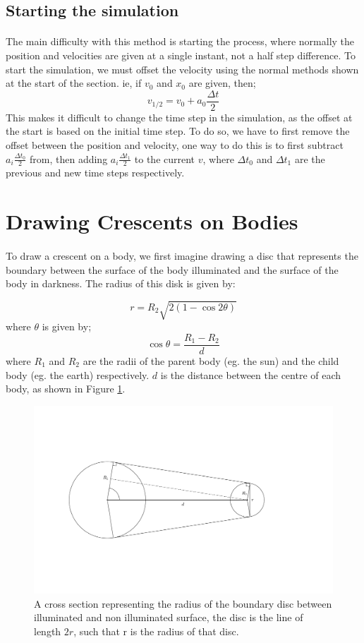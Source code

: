 \documentclass{article}
\begin{document}
\subsection{Starting the simulation}
\paragraph{}
The main difficulty with this method is starting the process, where normally the position and velocities are given at a single instant, not a half step difference.
To start the simulation, we must offset the velocity using the normal methods shown at the start of the section.
ie, if $v_0$ and $x_0$ are given, then;
$$v_{1/2} = v_0 + a_0 \frac{\Delta t}{2}$$
This makes it difficult to change the time step in the simulation, as the offset at the start is based on the initial time step.
To do so, we have to first remove the offset between the position and velocity, one way to do this is to first subtract $a_i \frac{\Delta t_0}{2}$ from, then adding $a_i \frac{\Delta t_1}{2}$ to the current $v$, where $\Delta t_0$ and $\Delta t_1$ are the previous and new time steps respectively. 

\section{Drawing Crescents on Bodies}
\paragraph{}To draw a crescent on a body, we first imagine drawing a disc that represents the boundary between the surface of the body illuminated and the surface of the body in darkness.
The radius of this disk is given by:

$$r = R_2\sqrt{2\left(1 - \cos{2\theta}\right)}$$
where $\theta$ is given by;
$$\cos{\theta} = \frac{R_1 - R_2}{d}$$
where $R_1$ and $R_2$ are the radii of the parent body (eg. the sun) and the child body (eg. the earth) respectively. $d$ is the distance between the centre of each body, as shown in Figure \ref{fig:crescentRadius}.
\begin{figure}
	\includegraphics[width = 14cm]{CrescentRadius.pdf}
	\caption{A cross section representing the radius of the boundary disc between illuminated and non illuminated surface, the disc is the line of length $2r$, such that r is the radius of that disc.}
	\label{fig:crescentRadius}
\end{figure}
\end{document}
